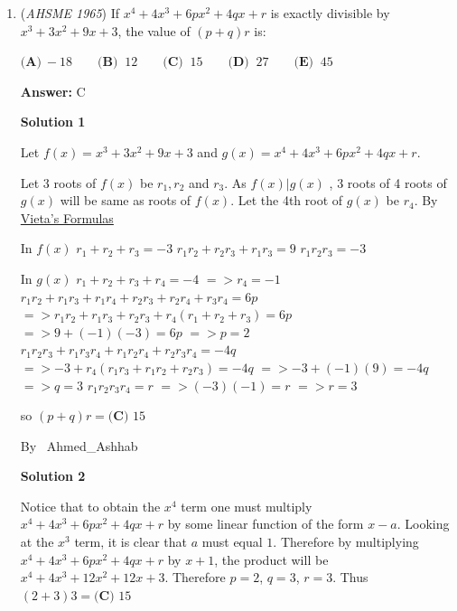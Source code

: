 \begin{enumerate}
\textbf{Solution}

The error made in this approximation is $\frac{1}{1+y}-(1-y)$, and the correct value is $\frac{1}{1+y}$. Taking the ratio of these two values, we have:\begin{align*} \\\frac{\frac{1}{1+y}-(1-y)}{\frac{1}{1+y}}&=\frac{[\frac{1}{1+y}-(1-y)][1+y]}{[\frac{1}{1+y}][1+y]} \\&=\frac{1-(1-y^2)}{1} \\&=y^2 \\\end{align*}


 Thus, our answer is $\boxed{\textbf{(B) }y^2}$



	\item (\textit{AHSME 1965}) If $x^4 + 4x^3 + 6px^2 + 4qx + r$ is exactly divisible by $x^3 + 3x^2 + 9x + 3$, the value of $(p + q)r$ is: 


 $\textbf{(A)}\ - 18 \qquad  \textbf{(B) }\ 12 \qquad  \textbf{(C) }\ 15 \qquad  \textbf{(D) }\ 27 \qquad  \textbf{(E) }\ 45 \qquad$

 \textbf{Answer: }C



\textbf{Solution 1}

Let $f(x)=x^3+3x^2+9x+3$ and $g(x)=x^4+4x^3+6px^2+4qx+r$. 

 Let 3 roots of $f(x)$ be $r_1, r_2$ and $r_3$. As  $f(x)|g(x)$ , 3 roots of 4 roots of $g(x)$ will be same as roots of $f(x)$. Let  the 4th root of $g(x)$ be $r_4$.  By \href{https://artofproblemsolving.com/wiki/index.php?title=Vieta\%27s\_Formulas}{Vieta's Formulas}

 In $f(x)$
$r_1+r_2+r_3=-3$
$r_1r_2+r_2r_3+r_1r_3=9$
$r_1r_2r_3=-3$

 In $g(x)$
$r_1+r_2+r_3+r_4=-4$
$=>r_4=-1$
$r_1r_2+r_1r_3+r_1r_4+r_2r_3+r_2r_4+r_3r_4=6p$
$=>r_1r_2+r_1r_3+r_2r_3+r_4(r_1+r_2+r_3)=6p$
$=>9+(-1)(-3)=6p$
$=>p=2$
$r_1r_2r_3+r_1r_3r_4+r_1r_2r_4+r_2r_3r_4=-4q$
$=>-3+r_4(r_1r_3+r_1r_2+r_2r_3)=-4q$
$=>-3+(-1)(9)=-4q$
$=>q=3$
$r_1r_2r_3r_4=r$
$=>(-3)(-1)=r$
$=>r=3$

 so $(p+q)r=\boxed{\textbf{(C) }15}$

 By ~Ahmed\_Ashhab

 



\textbf{Solution 2}

Notice that to obtain the $x^4$ term one must multiply $x^4+4x^3+6px^2+4qx+r$ by some linear function of the form $x-a$. Looking at the $x^3$ term, it is clear that $a$ must equal $1$. Therefore by multiplying $x^4+4x^3+6px^2+4qx+r$ by $x+1$, the product will be $x^4+4x^3+12x^2+12x+3$. Therefore  $p=2$, $q=3$, $r=3$. Thus $(2+3)3=\boxed{\textbf{(C) }15}$




\end{enumerate}
